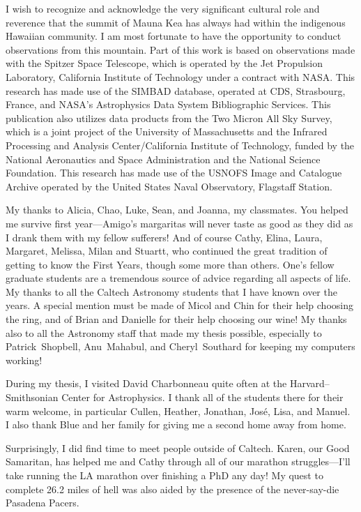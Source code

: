 \begin{acknowledgements}
I wish to recognize and acknowledge the very
significant cultural role and reverence that the summit of Mauna Kea
has always had within the indigenous Hawaiian community.  I am most
fortunate to have the opportunity to conduct observations from this
mountain. 
Part of this work is based on observations made with the Spitzer Space Telescope, which is operated by the Jet Propulsion Laboratory, California Institute of Technology under a contract with NASA.
This research has made use of the SIMBAD database, operated at CDS, Strasbourg, France, and NASA's Astrophysics Data System Bibliographic Services. 
This publication also utilizes data products from the Two Micron All Sky Survey, which is a joint project of the University of Massachusetts and the Infrared Processing and Analysis Center/California Institute of Technology, funded by the National Aeronautics and Space Administration and the National Science Foundation. 
This research has made use of the USNOFS Image and Catalogue Archive operated by the United States Naval Observatory, Flagstaff Station.

My thanks to Alicia, Chao, Luke, Sean, and Joanna, my classmates.
You helped me survive first year---Amigo's margaritas will never taste as good as they did as I drank them with my fellow sufferers!
And of course Cathy, Elina, Laura, Margaret, Melissa, Milan and Stuartt, who continued the great tradition of getting to know the First Years, though some more than others.
One's fellow graduate students are a tremendous source of advice regarding all aspects of life.
My thanks to all the Caltech Astronomy students that I have known over the years.
A special mention must be made of Micol and Chin for their help choosing the ring, and of Brian and Danielle for their help choosing our wine!
My thanks also to all the Astronomy staff that made my thesis possible, especially to Patrick~Shopbell, Anu~Mahabul, and Cheryl~Southard for keeping my computers working!

During my thesis, I visited David Charbonneau quite often at the Harvard--Smithsonian Center for Astrophysics.
I thank all of the students there for their warm welcome, in particular Cullen, Heather, Jonathan, Jos\'{e}, Lisa, and Manuel. 
I also thank Blue and her family for giving me a second home away from home.

Surprisingly, I did find time to meet people outside of Caltech.
Karen, our Good Samaritan, has helped me and Cathy through all of our marathon struggles---I'll take running the LA marathon over finishing a PhD any day!
My quest to complete 26.2 miles of hell was also aided by the presence of the never-say-die Pasadena Pacers.



\end{acknowledgements}
